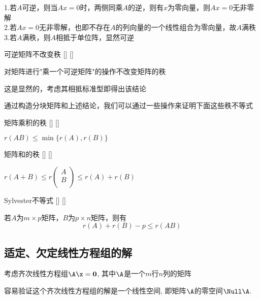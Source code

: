 \documentclass[UTF8]{ctexart}
\begin{document}
        \begin{prf}
            1.若$A$可逆，则当$Ax=0$时，两侧同乘$A$的逆，则有$x$为零向量，则$Ax=0$无非零解\\
            2.若$Ax=0$无非零解，也即不存在$A$的列向量的一个线性组合为零向量，故$A$满秩\\
            3.若$A$满秩，则$A$相抵于单位阵，显然可逆
        \end{prf}
        
	    \begin{ppt}
			[]
			{可逆矩阵不改变秩}
			[]
			[]

            对矩阵进行"乘一个可逆矩阵"的操作不改变矩阵的秩
        \end{ppt}
        \begin{prf}
            这是显然的，考虑其相抵标准型即得出该结论
        \end{prf}
        通过构造分块矩阵和上述结论，我们可以通过一些操作来证明下面这些秩不等式
        \begin{thm}
			[]
			{矩阵乘积的秩}
			[]
			[]

            $r(AB)\leq \min\{r(A),r(B)\}$
        \end{thm}
        \begin{thm}
			[]
			{矩阵和的秩}
			[]
			[]

            $r(A + B) \leq r\begin{pmatrix} A \\B \\ \end{pmatrix} \leq r(A) + r(B)$
        \end{thm}

        \begin{thm}
			[]
			{Sylvester不等式}
			[]
			[]
        
            若$A$为$m\times p$矩阵，$B$为$p\times n$矩阵，则有
            \[r(A)+r(B)-p\leq r(AB)\]
        \end{thm}
	\subsection{适定、欠定线性方程组的解}

		考虑齐次线性方程组$\A\x=\mathbf{0}$, 其中$\A$是一个$m$行$n$列的矩阵

		容易验证这个齐次线性方程组的解是一个线性空间, 即矩阵$\A$的零空间$\Null\A$. 
\end{document}
